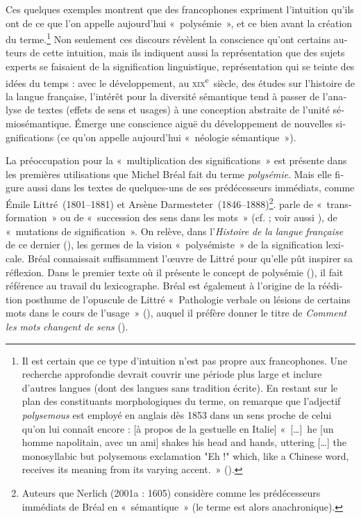 \documentclass[output=paper]{langsci/langscibook}
\begin{document}
\begin{otherlanguage}{french}
Ces quelques exemples montrent que des francophones expriment l’intuition qu’ils ont de ce que l’on appelle aujourd’hui «~polysémie~», et ce bien avant la création du terme.\footnote{Il est certain que ce type d’intuition n’est pas propre aux francophones. Une recherche approfondie devrait couvrir une période plus large et inclure d’autres langues (dont des langues sans tradition écrite). En restant sur le plan des constituants morphologiques du terme, on remarque que l’adjectif \textit{polysemous} est employé en anglais dès 1853 dans un sens proche de celui qu’on lui connaît encore : [à propos de la gestuelle en Italie] «~[…]~he [un homme napolitain, avec un ami] shakes his head and hands, uttering […] the monosyllabic but polysemous exclamation "Eh !" which, like a Chinese word, receives its meaning from its varying accent.~» (\citealt[534]{wiseman_essays_1853}).} Non seulement ces discours révèlent la conscience qu’ont certains auteurs de cette intuition, mais ils indiquent aussi la représentation que des sujets experts se faisaient de la signification linguistique, représentation qui se teinte des idées du temps : avec le développement, au \textsc{xix}\textsuperscript{e}~siècle, des études sur l’histoire de la langue française, l’intérêt pour la diversité sémantique tend à passer de l’analyse de textes (effets de sens et usages) à une conception abstraite de l’unité sémiosémantique. Émerge une conscience aiguë du développement de nouvelles significations (ce qu’on appelle aujourd’hui «~néologie sémantique~»).

La préoccupation pour la «~multiplication des significations~» est présente dans les premières utilisations que Michel Bréal fait du terme \textit{polysémie}. Mais elle figure aussi dans les textes de quelques-uns de ses prédécesseurs immédiats, comme Émile Littré~(1801--1881) et Arsène Darmesteter~(1846--1888)\footnote{ \textrm{Auteurs que Nerlich (2001a : 1605) considère comme les prédécesseurs immédiats de Bréal en «~sémantique~» (le terme est alors anachronique).}}. \citet[11--12]{darmesteter_traite_1874} parle de «~transformation~» ou de «~succession des sens dans les mots~» (cf. \citealt{darmesteter_sur_1876}; voir aussi \citealt{bailly_transformation_1874}), \citet[1]{littre_etudes_1880} de «~mutations de signification~». On relève, dans l’\textit{Histoire} \textit{de} \textit{la} \textit{langue} \textit{française} de ce dernier (\citealt{littre_histoire_1863}), les germes de la vision «~polysémiste~» de la signification lexicale. Bréal connaissait suffisamment l’œuvre de Littré pour qu’elle pût inspirer sa réflexion. Dans le premier texte où il présente le concept de polysémie (\citealt{breal_lhistoire_1887}), il fait référence au travail du lexicographe. Bréal est également à l’origine de la réédition posthume de l’opuscule de Littré «~Pathologie verbale ou lésions de certains mots dans le cours de l’usage~» (\citealt{littre_etudes_1880}), auquel il préfère donner le titre de \textit{Comment} \textit{les} \textit{mots} \textit{changent} \textit{de} \textit{sens} (\citealt{littre_comment_1888}).


\end{otherlanguage}
\end{document}
